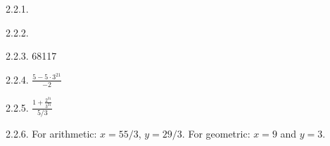  \protect {} \protect \begin {itemize} 
\begin{ans}{2.2.1.}
	
\end{ans}
\begin{ans}{2.2.2.}
	
\end{ans}
\begin{ans}{2.2.3.}
		68117
	
\end{ans}
\begin{ans}{2.2.4.}
		$\frac{5-5\cdot 3^{21}}{-2}$
	
\end{ans}
\begin{ans}{2.2.5.}
		$\frac{1 + \frac{2^{31}}{3^{31}}}{5/3}$
	
\end{ans}
\begin{ans}{2.2.6.}
		For arithmetic: $x = 55/3$, $y = 29/3$.  For geometric: $x = 9$ and $y = 3$.
	

\end{ans}
\end{itemize}
